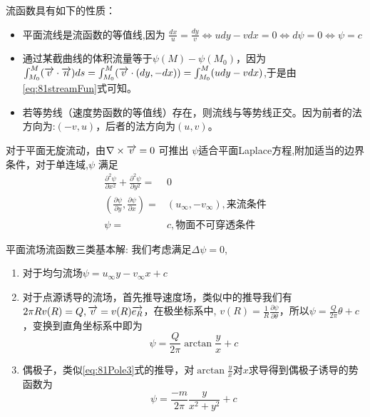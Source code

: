 流函数具有如下的性质：
\begin{itemize}
\item 平面流线是流函数的等值线,因为
$\frac{dx}{u}=\frac{dy}{v}\Leftrightarrow udy-vdx=0 \Leftrightarrow d\psi=0 \Leftrightarrow \psi=c$
\item 通过某截曲线的体积流量等于$\psi(M)-\psi(M_0)$，因为
$\int_{M_0}^M (\overrightarrow{v}\cdot \overrightarrow{n})ds=\int_{M_0}^M (\overrightarrow{v}\cdot (dy,-dx))=\int_{M_0}^M (udy-vdx)$,于是由\eqref{eq:81streamFun}式可知。
\item 若等势线（速度势函数的等值线）存在，则流线与等势线正交。因为前者的法方向为:$(-v,u)$，后者的法方向为$(u,v)$。
\end{itemize}

对于平面无旋流动，由$\nabla\times \overrightarrow{v}=0$ 可推出 $\psi$适合平面Laplace方程,附加适当的边界条件，对于单连域,$\psi$
满足
\begin{align}
\frac{\partial^2 \psi}{\partial x^2}+\frac{\partial^2 \psi}{\partial y^2}=&0\nonumber\\
(\frac{\partial \psi}{\partial y},\frac{\partial \psi}{\partial x})=&(u_{\infty},-v_{\infty}),\text{来流条件} \nonumber\\
\psi=&c,\text{物面不可穿透条件}
\end{align}

平面流场流函数三类基本解:
我们考虑满足$\Delta \psi=0$,
\begin{enumerate}
\item 对于均匀流场$\psi=u_{\infty}y-v_{\infty}x+c$
\item 对于点源诱导的流场，首先推导速度场，类似中的推导我们有$2\pi R v(R)=Q,\overrightarrow{v}=v(R)\overrightarrow{e_R}$，在极坐标系中,
$v(R)=\frac{1}{R}\frac{\partial \psi}{\partial \theta}$，所以$\psi=\frac{Q}{2\pi}\theta+c$，变换到直角坐标系中即为
\begin{equation}
\psi=\frac{Q}{2\pi}\arctan\frac{y}{x}+c
\end{equation}
\item 偶极子，类似\eqref{eq:81Pole3}式的推导，对$\arctan\frac{y}{x}$对$x$求导得到偶极子诱导的势函数为
\begin{equation}
\psi=\frac{-m}{2\pi}\frac{y}{x^2+y^2}+c
\end{equation}
\end{enumerate}
\begin{equation}
\end{equation}
\begin{equation}
\end{equation}
